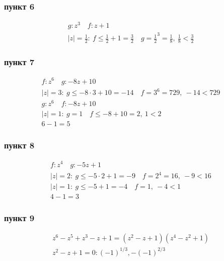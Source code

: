 \subsubsection*{пункт 6}
	\begin{gather*}
		g: z^3\quad f: z + 1\\
		|z|= \frac{1}{2}:\ f \leqslant \frac{1}{2} + 1 = \frac{3}{2}\quad g = \frac{1}{2}^{3} = \frac{1}{8},\ \frac{1}{8} < \frac{3}{2}
	\end{gather*}
\subsubsection*{пункт 7}
	\begin{gather*}
		f: z^6\quad g: -8z + 10\\
		|z|=3:\ g \leqslant -8 \cdot 3 + 10 = -14 \quad f = 3^6 = 729,\ -14 < 729\\
		g: z^6\quad f: -8z + 10\\
		|z|=1:\ g = 1\quad f \leqslant -8 + 10 = 2,\ 1 < 2\\
		6 - 1 = 5
	\end{gather*}
\subsubsection*{пункт 8}
	\begin{gather*}
		f: z^4\quad g: -5z + 1\\
		|z|=2:\ g \leqslant -5 \cdot 2 + 1 = -9 \quad f = 2^4 = 16,\ -9 < 16\\
		|z|=1:\ g \leqslant -5 + 1 = -4 \quad f = 1,\ -4 < 1\\
		4 - 1 = 3
	\end{gather*}
\subsubsection*{пункт 9}
	\begin{gather*}
		z^6 - z^5 + z^3 - z + 1 = (z^2 - z + 1)(z^4 - z^2 + 1)\\
		z^2 - z + 1 = 0: (-1)^{1/3}, -(-1)^{2/3}
	\end{gather*}
